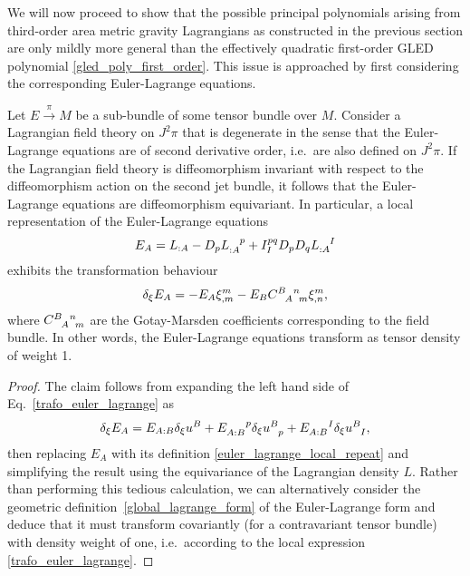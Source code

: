 We will now proceed to show that the possible principal polynomials arising from third-order area metric gravity Lagrangians as constructed in the previous section are only mildly more general than the effectively quadratic first-order GLED polynomial \eqref{gled_poly_first_order}. This issue is approached by first considering the corresponding Euler-Lagrange equations.

\begin{proposition}\label{prop_euler_tensor}
  Let $E\overset{\pi}{\longrightarrow}M$ be a sub-bundle of some tensor bundle over $M$. Consider a Lagrangian field theory on $J^2\pi$ that is degenerate in the sense that the Euler-Lagrange equations are of second derivative order, i.e.~are also defined on $J^2\pi$. If the Lagrangian field theory is diffeomorphism invariant with respect to the diffeomorphism action on the second jet bundle, it follows that the Euler-Lagrange equations are diffeomorphism equivariant. In particular, a local representation of the Euler-Lagrange equations
  \begin{equation}\label{euler_lagrange_local_repeat}
  E_A = L_{:A} - D_p L_{:A}^{\hphantom{:A}p} + I_I^{pq} D_p D_q L_{:A}^{\hphantom{:A}I}
  \end{equation}
  exhibits the transformation behaviour
  \begin{equation}\label{trafo_euler_lagrange}
    \delta_\xi E_A = -E_A \xi^m_{,m} - E_B \gmc{B}{A}{n}{m} \xi^m_{,n},
  \end{equation}
  where $\gmc{B}{A}{n}{m}$ are the Gotay-Marsden coefficients corresponding to the field bundle. In other words, the Euler-Lagrange equations transform as tensor density of weight 1.
\end{proposition}
\begin{proof}
  The claim follows from expanding the left hand side of Eq.~\eqref{trafo_euler_lagrange} as
  \begin{equation}
    \delta_\xi E_A = E_{A:B} \delta_\xi u^B + E_{A:B}^{\hphantom{A:B}p} \delta_\xi u^B_{\hphantom Bp} + E_{A:B}^{\hphantom{A:B}I} \delta_\xi u^B_{\hphantom BI},
  \end{equation}
  then replacing $E_A$ with its definition \eqref{euler_lagrange_local_repeat} and simplifying the result using the equivariance of the Lagrangian density $L$. Rather than performing this tedious calculation, we can alternatively consider the geometric definition~\eqref{global_lagrange_form} of the Euler-Lagrange form and deduce that it must transform covariantly (for a contravariant tensor bundle) with density weight of one, i.e.~according to the local expression \eqref{trafo_euler_lagrange}.
\end{proof}

